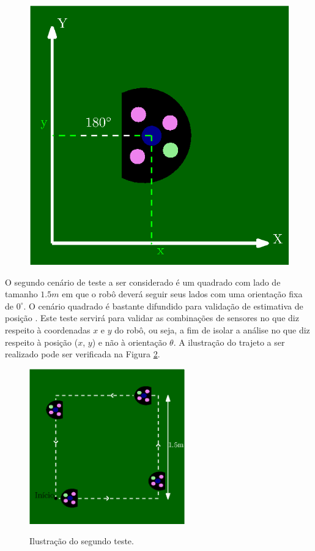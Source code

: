 \documentclass[acronym, symbols, table]{fei}
\begin{document}
\begin{figure}[!htb]
\begin{minipage}{0.45\textwidth}
				\includegraphics[width=\linewidth]{teste_1_180_graus.eps}
				\label{fig:metodologia_teste_1_b}
			\end{minipage}
		\end{figure}
		
		O segundo cenário de teste a ser considerado é um quadrado com lado de tamanho $1.5m$ em que o robô deverá seguir seus lados com uma orientação fixa de $0^\circ$. O cenário quadrado é bastante difundido para validação de estimativa de posição \cites{rostami2018localization}{gonccalves2008real}{santini1997trajectory}. Este teste servirá para validar as combinações de sensores no que diz respeito à coordenadas $x$ e $y$ do robô, ou seja, a fim de isolar a análise no que diz respeito à posição ($x$, $y$) e não à orientação $\theta$. A ilustração do trajeto a ser realizado pode ser verificada na Figura \ref{fig:metodologia_teste_2}.
		
		\begin{figure}[!htb]
			\centering
			\caption{Ilustração do segundo teste.}
			\includegraphics[width=0.6\textwidth]{teste_2.eps}
			\label{fig:metodologia_teste_2}
		\end{figure}
		
\end{document}
